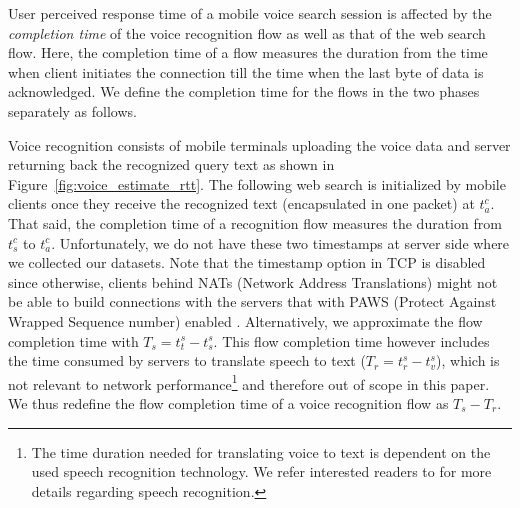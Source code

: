 
User perceived response time of a mobile voice search session is affected by the \emph{completion time} of the voice recognition flow as well as that of the web search flow. Here, the completion time of a flow measures the duration from the time when client initiates the connection till the time when the last byte of data is acknowledged. We define the completion time for the flows in the two phases separately as follows.

Voice recognition consists of mobile terminals uploading the voice data and server returning back the recognized query text as shown in Figure~\ref{fig:voice_estimate_rtt}. The following web search is initialized by mobile clients once they receive the recognized text (encapsulated in one packet) at $t^c_a$. That said, the completion time of a recognition flow measures the duration from $t^c_s$ to $t^c_a$. Unfortunately, we do not have these two timestamps at server side where we collected our datasets. Note that the timestamp option in TCP is disabled since otherwise, clients behind NATs (Network Address Translations) might not be able to build connections with the servers that with PAWS (Protect Against Wrapped Sequence number) \cite{rfc7323} enabled \cite{Wang:2011:USM:2018436.2018479}. Alternatively, we approximate the flow completion time with $T_s=t^s_t - t^s_s$. This flow completion time however includes the time consumed by servers to translate speech to text ($T_r=t^s_r - t^s_v$), which is not relevant to network performance\footnote{The time duration needed for translating voice to text is dependent on the used speech recognition technology. We refer interested readers to \cite{36463,schalkwyk2010your} for more details regarding speech recognition.} and therefore out of scope in this paper. We thus redefine the flow completion time of a voice recognition flow as $T_s-T_r$.

